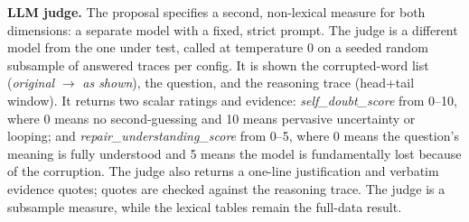 \documentclass[11pt]{article}
\begin{document}
\noindent\textbf{LLM judge.} The proposal specifies a second,
non-lexical measure for both dimensions: a separate model with a fixed, strict prompt.
The judge is a different model from the one under test, called at temperature 0 on a
seeded random subsample of answered traces per config. It is shown the corrupted-word
list (\emph{original} $\to$ \emph{as shown}), the question, and the reasoning trace
(head+tail window). It returns two scalar ratings and evidence: \emph{self\_doubt\_score}
from 0--10, where 0 means no second-guessing and 10 means pervasive uncertainty or
looping; and \emph{repair\_understanding\_score} from 0--5, where 0 means the question's
meaning is fully understood and 5 means the model is fundamentally lost because of the
corruption. The judge also returns a one-line justification and verbatim evidence quotes;
quotes are checked against the reasoning trace. The judge is a subsample measure, while
the lexical tables remain the full-data result.
\medskip



\end{document}
